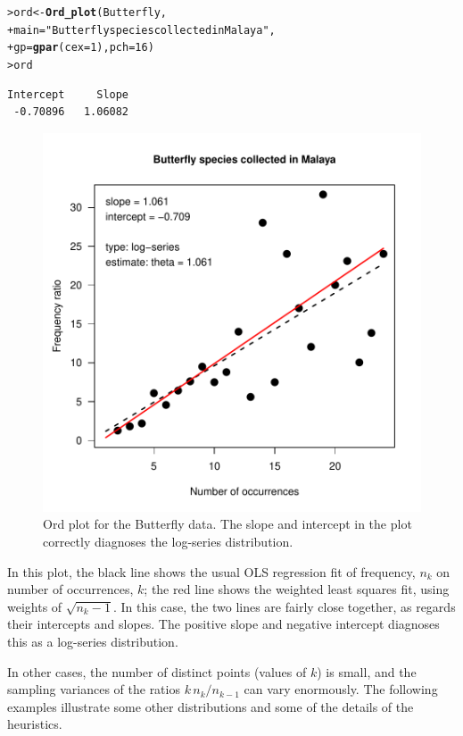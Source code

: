 \documentclass[10pt,krantz2]{krantz}\usepackage[]{graphicx}\usepackage[]{color}
\makeatletter
\newcommand{\hlnum}[1]{\textcolor[rgb]{0.686,0.059,0.569}{#1}}%
\newcommand{\hlstr}[1]{\textcolor[rgb]{0.192,0.494,0.8}{#1}}%
\newcommand{\hlstd}[1]{\textcolor[rgb]{0.345,0.345,0.345}{#1}}%
\newcommand{\hlkwb}[1]{\textcolor[rgb]{0.69,0.353,0.396}{#1}}%
\newcommand{\hlkwc}[1]{\textcolor[rgb]{0.333,0.667,0.333}{#1}}%
\newcommand{\hlkwd}[1]{\textcolor[rgb]{0.737,0.353,0.396}{\textbf{#1}}}%
\newenvironment{kframe}{%
 \def\at@end@of@kframe{}%
 \ifinner\ifhmode%
  \def\at@end@of@kframe{\end{minipage}}%
  \begin{minipage}{\columnwidth}%
 \fi\fi%
 \def\FrameCommand##1{\hskip\@totalleftmargin \hskip-\fboxsep
 \colorbox{shadecolor}{##1}\hskip-\fboxsep
     \hskip-\linewidth \hskip-\@totalleftmargin \hskip\columnwidth}%
 \MakeFramed {\advance\hsize-\width
   \@totalleftmargin\z@ \linewidth\hsize
   \@setminipage}}%
 {\par\unskip\endMakeFramed%
 \at@end@of@kframe}
\newenvironment{knitrout}{}{} %
\renewenvironment{knitrout}{\small\renewcommand{\baselinestretch}{.85}}{} %
\makeatother
\begin{document}
\begin{knitrout}
\color{fgcolor}\begin{kframe}
\begin{alltt}
\hlstd{> }\hlstd{ord} \hlkwb{<-} \hlkwd{Ord_plot}\hlstd{(Butterfly,}
\hlstd{+ }                \hlkwc{main} \hlstd{=} \hlstr{"Butterfly species collected in Malaya"}\hlstd{,}
\hlstd{+ }                \hlkwc{gp} \hlstd{=} \hlkwd{gpar}\hlstd{(}\hlkwc{cex} \hlstd{=} \hlnum{1}\hlstd{),} \hlkwc{pch} \hlstd{=} \hlnum{16}\hlstd{)}
\hlstd{> }\hlstd{ord}
\end{alltt}
\begin{verbatim}
Intercept     Slope 
 -0.70896   1.06082 
\end{verbatim}
\end{kframe}\begin{figure}[!htbp]

\centerline{\includegraphics[width=.5\textwidth]{ch03/fig/ordplot1-1} }

\caption[Ord plot for the Butterfly data]{Ord plot for the Butterfly data. The slope and intercept in the plot correctly diagnoses the log-series distribution.\label{fig:ordplot1}}
\end{figure}


\end{knitrout}
In this plot, the black line shows the usual OLS regression fit of
frequency, $n_k$ on number of occurrences, $k$;  the red line shows
the weighted least squares fit, using weights of $\sqrt{n_k-1}$.
In this case, the two lines are fairly close together, as regards
their intercepts and slopes.  The positive slope and negative intercept
diagnoses this as a log-series distribution.

In other cases, the number of distinct points (values of $k$) is small,
and the sampling variances of the ratios $ k \, n_k / n_{k-1}$ can vary
enormously.  The following examples illustrate some other distributions
and some of the details of the heuristics.
\end{document}
